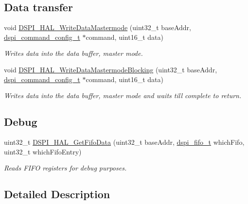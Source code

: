 \subsection*{Data transfer}
\begin{DoxyCompactItemize}
\item 
void \hyperlink{group__dspi__hal_gab0c96db580d27200d4afc44383f52d73}{D\+S\+P\+I\+\_\+\+H\+A\+L\+\_\+\+Write\+Data\+Mastermode} (uint32\+\_\+t base\+Addr, \hyperlink{group__dspi__hal_gaaf494c415fa4baf4998efa41992e85ce}{dspi\+\_\+command\+\_\+config\+\_\+t} $\ast$command, uint16\+\_\+t data)
\begin{DoxyCompactList}\small\item\em Writes data into the data buffer, master mode. \end{DoxyCompactList}\item 
void \hyperlink{group__dspi__hal_ga59b29aae7daf75de09c4a8e6b637bd7c}{D\+S\+P\+I\+\_\+\+H\+A\+L\+\_\+\+Write\+Data\+Mastermode\+Blocking} (uint32\+\_\+t base\+Addr, \hyperlink{group__dspi__hal_gaaf494c415fa4baf4998efa41992e85ce}{dspi\+\_\+command\+\_\+config\+\_\+t} $\ast$command, uint16\+\_\+t data)
\begin{DoxyCompactList}\small\item\em Writes data into the data buffer, master mode and waits till complete to return. \end{DoxyCompactList}\end{DoxyCompactItemize}
\subsection*{Debug}
\begin{DoxyCompactItemize}
\item 
uint32\+\_\+t \hyperlink{group__dspi__hal_ga524e117873f9f93c2118f0175b9f6cc5}{D\+S\+P\+I\+\_\+\+H\+A\+L\+\_\+\+Get\+Fifo\+Data} (uint32\+\_\+t base\+Addr, \hyperlink{group__dspi__hal_ga4b51d4ff135ca4cb541d18e20b2c0995}{dspi\+\_\+fifo\+\_\+t} which\+Fifo, uint32\+\_\+t which\+Fifo\+Entry)
\begin{DoxyCompactList}\small\item\em Reads F\+I\+FO registers for debug purposes. \end{DoxyCompactList}\end{DoxyCompactItemize}


\subsection{Detailed Description}


